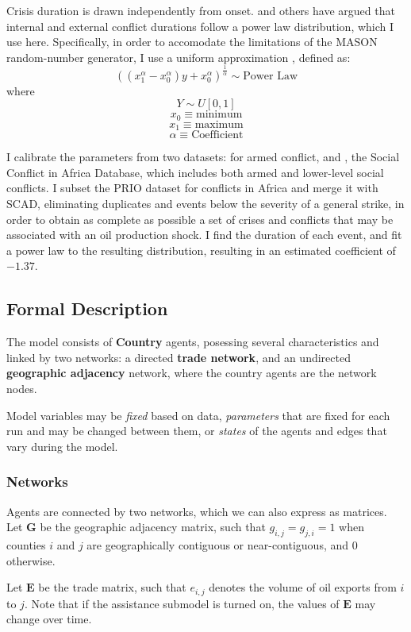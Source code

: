 \documentclass{article}
\begin{document}
Crisis duration is drawn independently from onset. \citet{cioffi_2004} and others have argued that internal and external conflict durations follow a power law distribution, which I use here. Specifically, in order to accomodate the limitations of the MASON random-number generator, I use a uniform approximation \citep{weisstein_2013}, defined as:
$$
\left((x_{1}^{\alpha} - x_{0}^{\alpha})y + x_{0}^{\alpha}\right)^{\frac{1}{\alpha}} \sim \text{Power Law}
$$
where 
$$Y \sim U[0,1]$$
$$ x_0  \equiv \text{minimum}$$
$$ x_1  \equiv \text{maximum}$$
$$ \alpha \equiv \text{Coefficient}$$

I calibrate the parameters from two datasets: \citet{PRIO} for armed conflict, and \citep{hendrix_2013}, the Social Conflict in Africa Database, which includes both armed and lower-level social conflicts. I subset the PRIO dataset for conflicts in Africa and merge it with SCAD, eliminating duplicates and events below the severity of a general strike, in order to obtain as complete as possible a set of crises and conflicts that may be associated with an oil production  shock. I find the duration of each event, and fit a power law to the resulting distribution, resulting in an estimated coefficient of $\mathbf{-1.37}$.

\subsection{Formal Description}

The model consists of \textbf{Country} agents, posessing several characteristics and linked by two networks: a directed \textbf{trade network}, and an undirected \textbf{geographic adjacency} network, where the country agents are the network nodes.

Model variables may be \emph{fixed} based on data, \emph{parameters} that are fixed for each run and may be changed between them, or \emph{states} of the agents and edges that vary during the model.

\subsubsection{Networks}

Agents are connected by two networks, which we can also express as matrices. Let $\mathbf{G}$ be the geographic adjacency matrix, such that $g_{i,j}=g_{j,i}=1$ when counties $i$ and $j$ are geographically contiguous or near-contiguous, and $0$ otherwise. 

Let $\mathbf{E}$ be the trade matrix, such that $e_{i,j}$ denotes the volume of oil exports from $i$ to $j$. Note that if the assistance submodel is turned on, the values of $\mathbf{E}$ may change over time.
\end{document}
